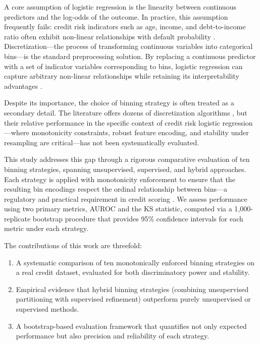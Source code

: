 \documentclass[11pt]{article}
\begin{document}
A core assumption of logistic regression is the linearity between continuous predictors and the log-odds of the outcome. In practice, this assumption frequently fails: credit risk indicators such as age, income, and debt-to-income ratio often exhibit non-linear relationships with default probability \citep{thomas2017credit}. Discretization---the process of transforming continuous variables into categorical bins---is the standard preprocessing solution. By replacing a continuous predictor with a set of indicator variables corresponding to bins, logistic regression can capture arbitrary non-linear relationships while retaining its interpretability advantages \citep{siddiqi2012credit, anderson2007credit}.

Despite its importance, the choice of binning strategy is often treated as a secondary detail. The literature offers dozens of discretization algorithms \citep{garcia2013survey, kotsiantis2006discretization, dougherty1995supervised}, but their relative performance in the specific context of credit risk logistic regression---where monotonicity constraints, robust feature encoding, and stability under resampling are critical---has not been systematically evaluated.

This study addresses this gap through a rigorous comparative evaluation of ten binning strategies, spanning unsupervised, supervised, and hybrid approaches. Each strategy is applied with monotonicity enforcement to ensure that the resulting bin encodings respect the ordinal relationship between bins---a regulatory and practical requirement in credit scoring \citep{siddiqi2012credit}. We assess performance using two primary metrics, AUROC and the KS statistic, computed via a 1{,}000-replicate bootstrap procedure that provides 95\% confidence intervals for each metric under each strategy.

The contributions of this work are threefold:
\begin{enumerate}[nosep]
    \item A systematic comparison of ten monotonically enforced binning strategies on a real credit dataset, evaluated for both discriminatory power and stability.
    \item Empirical evidence that hybrid binning strategies (combining unsupervised partitioning with supervised refinement) outperform purely unsupervised or supervised methods.
    \item A bootstrap-based evaluation framework that quantifies not only expected performance but also precision and reliability of each strategy.
\end{enumerate}
\end{document}
